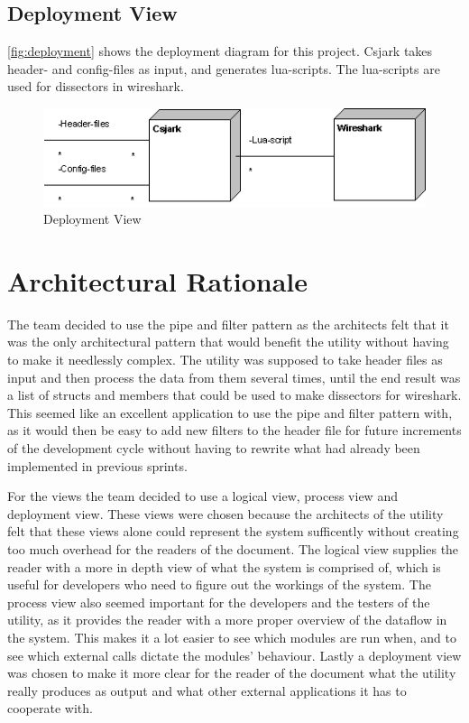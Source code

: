 \subsection{Deployment View}
\autoref{fig:deployment} shows the deployment diagram for this project. Csjark takes \gls{header}- and config-files as input, and generates \Gls{lua}-\glspl{script}. The \Gls{lua}-\glspl{script} are used for \glspl{dissector} in \Gls{wireshark}.

\begin{figure}[htb]
	\includegraphics[width = \textwidth]{./planning/img/Deployment}
	\caption{Deployment View\label{fig:deployment}}
\end{figure}


\section{Architectural Rationale}
The team decided to use the pipe and filter pattern as the architects felt that it was the only architectural pattern that would benefit the \gls{utility} without having to make it needlessly complex. The \gls{utility} was supposed to take \gls{header} files as input and then process the data from them several times, until the end result was a list of \glspl{struct} and \glspl{member} that could be used to make \glspl{dissector} for \Gls{wireshark}. This seemed like an excellent application to use the pipe and filter pattern with, as it would then be easy to add new filters to the \gls{header} file for future increments of the development cycle without having to rewrite what had already been implemented in previous sprints.

For the views the team decided to use a logical view, process view and deployment view. These views were chosen because the architects of the \gls{utility} felt that these views alone could represent the system sufficently without creating too much overhead for the readers of the document. The logical view supplies the reader with a more in depth view of what the system is comprised of, which is useful for developers who need to figure out the workings of the system. The process view also seemed important for the developers and the testers of the \gls{utility}, as it provides the reader with a more proper overview of the dataflow in the system. This makes it a lot easier to see which modules are run when, and to see which external calls dictate the modules' behaviour. Lastly a deployment view was chosen to make it more clear for the reader of the document what the \gls{utility} really produces as output and what other external applications it has to cooperate with. 


